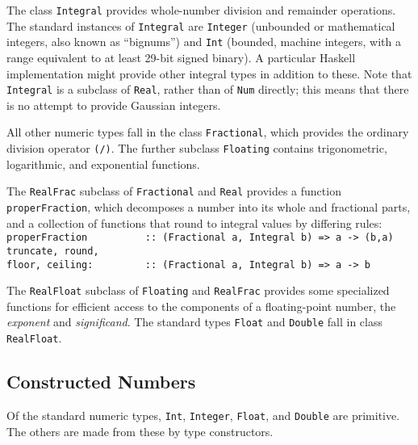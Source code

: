 The class \mbox{\tt Integral} provides whole-number division and remainder
operations.  The
standard instances of \mbox{\tt Integral} are \mbox{\tt Integer} (unbounded or
mathematical integers, also known as ``bignums'') and \mbox{\tt Int}
(bounded, machine integers, with a range equivalent to at least
29-bit signed binary).  A particular Haskell implementation might
provide other integral types in addition to these.  Note that
\mbox{\tt Integral} is a subclass of \mbox{\tt Real}, rather than of \mbox{\tt Num} directly;
this means that there is no attempt to provide Gaussian integers.

All other numeric types fall in the class \mbox{\tt Fractional}, which provides
the ordinary division operator \mbox{\tt (/)}.  The further subclass
\mbox{\tt Floating} contains trigonometric, logarithmic, and exponential functions.

The \mbox{\tt RealFrac} subclass of \mbox{\tt Fractional}  and \mbox{\tt Real} provides a function
\mbox{\tt properFraction}, which decomposes a number into its whole and
fractional parts, and a collection of functions that round to
integral values by differing rules:
\bprog
\mbox{\tt properFraction\ \ \ \ \ \ \ \ \ \ ::\ (Fractional\ a,\ Integral\ b)\ =>\ a\ ->\ (b,a)}\\
\mbox{\tt truncate,\ round,}\\
\mbox{\tt floor,\ ceiling:\ \ \ \ \ \ \ \ \ ::\ (Fractional\ a,\ Integral\ b)\ =>\ a\ ->\ b}
\eprog

The \mbox{\tt RealFloat} subclass of \mbox{\tt Floating} and \mbox{\tt RealFrac} provides
some specialized functions for efficient access to the components
of a floating-point number, the {\em exponent} and {\em significand}.
The standard types \mbox{\tt Float} and \mbox{\tt Double} fall in class \mbox{\tt RealFloat}.

\subsection{Constructed Numbers}

Of the standard numeric types, \mbox{\tt Int}, \mbox{\tt Integer}, \mbox{\tt Float}, and \mbox{\tt Double}
are primitive.  The others are made from these by type constructors.

